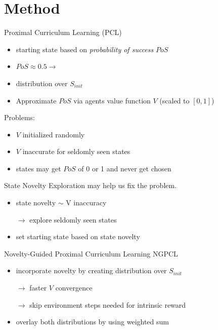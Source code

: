 \documentclass[aspectratio=169]{beamer}
\begin{document}
\section{Method}
\begin{frame}{Proximal Curriculum Learning (PCL)~\cite{prox_curr}}
  \begin{itemize}
    \item starting state based on \textit{probability of success} $PoS$
    \item $PoS \approx 0.5 \rightarrow$
    \item distribution over $S_{init}$
    \item Approximate $PoS$ via agents value function $V$ (scaled to $[0, 1]$)
  \end{itemize}
  \vfill
  \pause
  Problems:
  \begin{itemize}
    \item $V$ initialized randomly
    \item $V$ inaccurate for seldomly seen states
    \item states may get $PoS$ of 0 or 1 and never get chosen
  \end{itemize}
\end{frame}

\begin{frame}{State Novelty}
  Exploration may help us fix the problem.
  \begin{itemize}
    \item state novelty $\sim$ V inaccuracy
    \item[$\rightarrow$] explore seldomly seen states
    \item set starting state based on state novelty
  \end{itemize}
\end{frame}

\begin{frame}{Novelty-Guided Proximal Curriculum Learning NGPCL}
  \begin{itemize}
    \item incorporate novelty by creating distribution over $S_{init}$
    \item[$\rightarrow$] faster $V$ convergence
    \item[$\rightarrow$] skip environment steps needed for intrinsic reward
    \item overlay both distributions by using weighted sum
  \end{itemize}
\end{frame}
\end{document}
